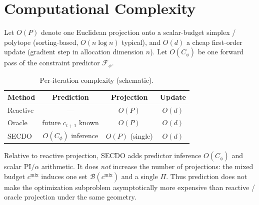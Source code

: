 \section{Computational Complexity}
\label{app:complexity}

Let $O(P)$ denote one Euclidean projection onto a scalar-budget simplex / polytope (sorting-based, $O(n\log n)$ typical), and $O(d)$ a cheap first-order update (gradient step in allocation dimension $n$).
Let $O(C_\phi)$ be one forward pass of the constraint predictor $\mathcal{F}_\phi$.

\begin{table}[h]
\centering
\caption{Per-iteration complexity (schematic).}
\label{tab:complexity}
\begin{tabular}{lccc}
\toprule
Method & Prediction & Projection & Update \\
\midrule
Reactive & --- & $O(P)$ & $O(d)$ \\
Oracle & future $c_{t+1}$ known & $O(P)$ & $O(d)$ \\
SECDO & $O(C_\phi)$ inference & $O(P)$ (single) & $O(d)$ \\
\bottomrule
\end{tabular}
\end{table}

Relative to reactive projection, SECDO adds predictor inference $O(C_\phi)$ and scalar $\mathrm{PI}/\alpha$ arithmetic.
It does \emph{not} increase the number of projections: the mixed budget $c^{\mathrm{mix}}$ induces one set $\mathcal{B}(c^{\mathrm{mix}})$ and a single $\Pi$.
Thus prediction does not make the optimization subproblem asymptotically more expensive than reactive / oracle projection under the same geometry.
